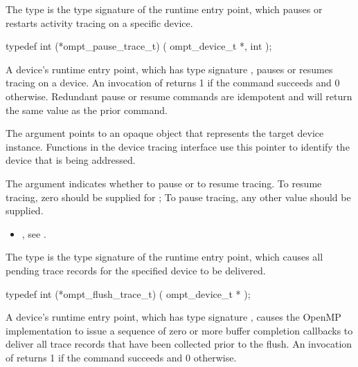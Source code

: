 \summary
The  type is the type signature of the 
 runtime entry point, which pauses or 
restarts activity tracing on a specific device.

\format
\begin{ccppspecific}
\begin{omptInquiry}
typedef int (*ompt_pause_trace_t) (
  ompt_device_t *,
  int 
);
\end{omptInquiry}
\end{ccppspecific}

\descr
A device's  runtime entry point, which has type
signature , pauses or resumes tracing on a device.
An invocation of  returns 1 if the command
succeeds and 0 otherwise. Redundant pause or resume commands are 
idempotent and will return the same value as the prior command. 

\argdesc
The  argument points to an opaque object that represents
the target device instance. Functions in the device tracing interface
use this pointer to identify the device that is being addressed.

The  argument indicates whether to pause or to resume 
tracing. To resume tracing, zero should be supplied for ;
To pause tracing, any other value should be supplied.

\crossreferences
\begin{itemize}
\item {}, see .
\end{itemize}



\label{sec:ompt_flush_trace_t}

\summary
The  type is the type signature of the 
 runtime entry point, which causes all 
pending trace records for the specified device to be delivered.

\format
\begin{ccppspecific}
\begin{omptInquiry}
typedef int (*ompt_flush_trace_t) (
  ompt_device_t *
);
\end{omptInquiry}
\end{ccppspecific}

\descr
A device's  runtime entry point, which has type
signature , causes the OpenMP implementation to 
issue a sequence of zero or more buffer completion callbacks to deliver 
all trace records that have been collected prior to the flush. An invocation 
of  returns 1 if the command succeeds and 0 otherwise.

